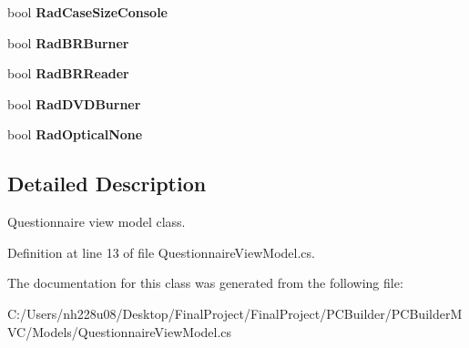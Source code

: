 \begin{DoxyCompactItemize}
\item 
bool {\bfseries Rad\+Case\+Size\+Console}\hypertarget{class_p_c_builder_m_v_c_1_1_models_1_1_questionnaire_view_model_afcda97a0d2e050f266f1fd4a946e8ad3}{}\label{class_p_c_builder_m_v_c_1_1_models_1_1_questionnaire_view_model_afcda97a0d2e050f266f1fd4a946e8ad3}

\item 
bool {\bfseries Rad\+B\+R\+Burner}\hypertarget{class_p_c_builder_m_v_c_1_1_models_1_1_questionnaire_view_model_ac2a515a19d207e3d1666bfebe953a967}{}\label{class_p_c_builder_m_v_c_1_1_models_1_1_questionnaire_view_model_ac2a515a19d207e3d1666bfebe953a967}

\item 
bool {\bfseries Rad\+B\+R\+Reader}\hypertarget{class_p_c_builder_m_v_c_1_1_models_1_1_questionnaire_view_model_a6324f7e025eec3b14c30810b6596ef75}{}\label{class_p_c_builder_m_v_c_1_1_models_1_1_questionnaire_view_model_a6324f7e025eec3b14c30810b6596ef75}

\item 
bool {\bfseries Rad\+D\+V\+D\+Burner}\hypertarget{class_p_c_builder_m_v_c_1_1_models_1_1_questionnaire_view_model_a42ac2abc179dba71b68df2c885ec749e}{}\label{class_p_c_builder_m_v_c_1_1_models_1_1_questionnaire_view_model_a42ac2abc179dba71b68df2c885ec749e}

\item 
bool {\bfseries Rad\+Optical\+None}\hypertarget{class_p_c_builder_m_v_c_1_1_models_1_1_questionnaire_view_model_a42f2bebe0e28900096f66be47bd558fc}{}\label{class_p_c_builder_m_v_c_1_1_models_1_1_questionnaire_view_model_a42f2bebe0e28900096f66be47bd558fc}

\end{DoxyCompactItemize}


\subsection{Detailed Description}
Questionnaire view model class. 



Definition at line 13 of file Questionnaire\+View\+Model.\+cs.



The documentation for this class was generated from the following file\+:\begin{DoxyCompactItemize}
\item 
C\+:/\+Users/nh228u08/\+Desktop/\+Final\+Project/\+Final\+Project/\+P\+C\+Builder/\+P\+C\+Builder\+M\+V\+C/\+Models/Questionnaire\+View\+Model.\+cs\end{DoxyCompactItemize}

